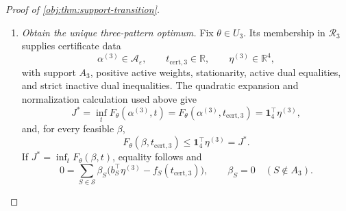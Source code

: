 \begin{proof}[Proof of \cref{obj:thm:support-transition}]
\begin{enumerate}
For the five-pattern certificate, define
\[
I_5=I_\theta(\alpha^{(5)}),
\qquad
c=\begin{pmatrix}-1\\1\end{pmatrix},
\qquad
w_5=\frac{v(t_{\mathrm{cert},5})}{J^*(\theta,p,\varepsilon)}.
\]
The matrix \(I_5\) is positive semidefinite, since it is a sum of nonnegative multiples of \(g_Sg_S^\top\). Stationarity and the certificate value give
\[
\mathbf1_2^\top I_5v(t_{\mathrm{cert},5})=0,
\qquad
v(t_{\mathrm{cert},5})^\top I_5v(t_{\mathrm{cert},5})=J^*.
\]
The first identity makes the two coordinates of \(I_5v(t_{\mathrm{cert},5})\) opposite; the second makes its second coordinate \(J^*\). Hence
\[
I_5v(t_{\mathrm{cert},5})=J^*c,
\qquad
I_5w_5=c,
\qquad
c^\top w_5=\frac1{J^*}=V^*.
\]
Every other solution \(w_{\mathrm{alt}}\in\mathbb R^2\) of \(I_5w_{\mathrm{alt}}=c\) has the same contrast value, because
\[
c^\top(w_{\mathrm{alt}}-w_5)
=w_5^\top I_5(w_{\mathrm{alt}}-w_5)=0.
\]
The contrast-variance convention in \cref{obj:thm:five-output-region} therefore gives variance \(V^*>0\), equal to its nonnegative part.

For the associated staircase channel,
\[
(P_\theta Q_{\alpha^{(5)}})(\{S\})
=\alpha^{(5)}_S h_S(\theta).
\]
The positive masses \(h_S(\theta)\) make precisely the five patterns in \(A_5\) active, so
\[
\kappa(Q_{\alpha^{(5)}})=5.
\]
Feasibility supplies unit row sums, and the ray entries \(1,3\) supply the privacy inequalities. Finally, \cref{obj:thm:five-output-region} gives
\[
\kappa(Q)\ge5
\]
for every attaining stationary \(\varepsilon\)-LDP channel on any measurable output space, since \(\iota(\theta)\in\mathcal R_5\).

\item \emph{Obtain the unique three-pattern optimum.}
Fix \(\theta\in U_3\). Its membership in \(\mathcal R_3\) supplies certificate data
\[
\alpha^{(3)}\in\mathcal A_\varepsilon,\qquad
t_{\mathrm{cert},3}\in\mathbb R,\qquad
\eta^{(3)}\in\mathbb R^4,
\]
with support \(A_3\), positive active weights, stationarity, active dual equalities, and strict inactive dual inequalities. The quadratic expansion and normalization calculation used above give
\[
J^*
=\inf_tF_\theta(\alpha^{(3)},t)
=F_\theta(\alpha^{(3)},t_{\mathrm{cert},3})
=\mathbf1_4^\top\eta^{(3)},
\]
and, for every feasible \(\beta\),
\[
F_\theta(\beta,t_{\mathrm{cert},3})
\le\mathbf1_4^\top\eta^{(3)}=J^*.
\]
If \(J^*=\inf_tF_\theta(\beta,t)\), equality follows and
\[
0=\sum_{S\in\mathcal S}\beta_S
 \bigl(b_S^\top\eta^{(3)}-f_S(t_{\mathrm{cert},3})\bigr),
\qquad
\beta_S=0\quad(S\notin A_3).
\]


\end{enumerate}
\end{proof}

